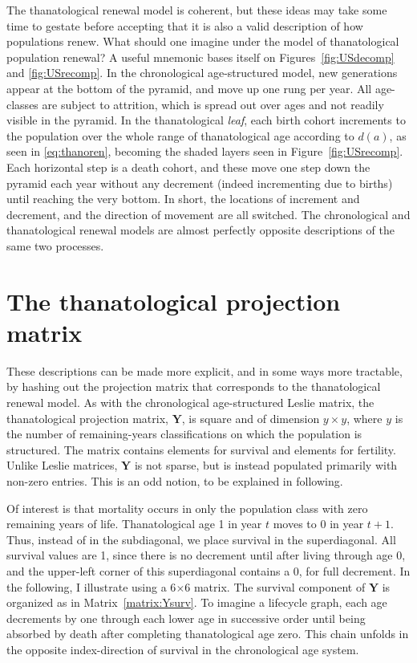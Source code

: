 \documentclass{article}
\begin{document}
The thanatological renewal model is coherent, but these ideas may take some time
to gestate before accepting that it is also a valid description of how
populations renew. What should one imagine under the model of thanatological
population renewal? A useful mnemonic bases itself on Figures~\ref{fig:USdecomp}
and \ref{fig:USrecomp}. In the chronological age-structured model, new
generations appear at the bottom of the pyramid, and move up one rung per year.
All age-classes are subject to attrition, which is spread out over ages and not
readily visible in the pyramid. In the thanatological \textit{leaf}, each birth cohort increments to the population over the whole range of thanatological age
according to $d(a)$, as seen in \eqref{eq:thanoren}, becoming the
shaded layers seen in Figure~\ref{fig:USrecomp}. Each horizontal step is a death
cohort, and these move one step down the pyramid each year without any decrement
(indeed incrementing due to births) until reaching the very bottom. In short,
the locations of increment and decrement, and the direction of movement are all
switched. The chronological and thanatological renewal models are almost
perfectly opposite descriptions of the same two processes.

\section*{The thanatological projection matrix}
These descriptions can be made more explicit, and in some ways more tractable,
by hashing out the projection matrix that corresponds to the thanatological renewal model. As with the
chronological age-structured Leslie matrix, the thanatological projection
matrix, $\textbf{Y}$, is square and of dimension $y \times y$, where $y$ is the number
of remaining-years classifications on which the population is structured. 
The matrix contains elements for survival and elements for fertility. Unlike
Leslie matrices, $\textbf{Y}$ is not sparse, but is instead populated primarily
with non-zero entries. This is an odd notion, to be explained in following.

Of interest is that mortality occurs in only the population class with zero
remaining years of life. Thanatological age 1 in year $t$ moves to 0 in year
$t + 1$. Thus, instead of in the subdiagonal, we place survival in the
superdiagonal. All survival values are 1, since there is no decrement until
after living through age 0, and the upper-left corner of this superdiagonal
contains a 0, for full decrement. In the following, I illustrate using a
6$\times$6 matrix. The survival component of $\textbf{Y}$ is organized as in
Matrix~\ref{matrix:Ysurv}. To imagine a lifecycle graph, each age decrements by
one through each lower age in successive order until being absorbed by death
after completing thanatological age zero. This chain unfolds in the opposite
index-direction of survival in the chronological age system.
\end{document}
